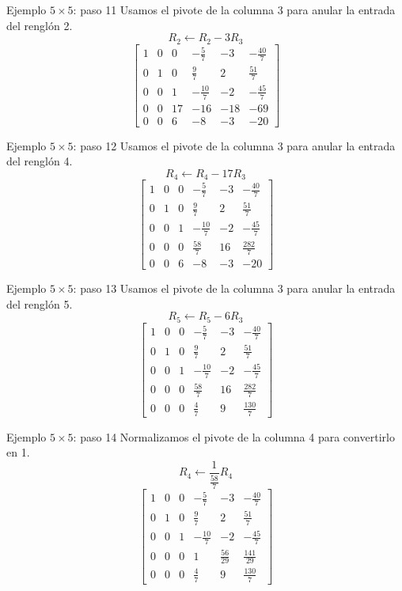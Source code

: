 \documentclass[aspectratio=169,9pt]{beamer}
\theoremstyle{remark}
\begin{document}
\begin{frame}[t]{Ejemplo $5\times5$: paso 11}
Usamos el pivote de la columna 3 para anular la entrada del renglón 2.
\[
R_{2}\leftarrow R_{2}-3R_{3}
\]
\[
\left[\begin{array}{ccccc|c}
1 & 0 & 0 & - \frac{5}{7} & -3 & - \frac{40}{7}\\
0 & 1 & 0 & \frac{9}{7} & 2 & \frac{51}{7}\\
0 & 0 & 1 & - \frac{10}{7} & -2 & - \frac{45}{7}\\
0 & 0 & 17 & -16 & -18 & -69\\
0 & 0 & 6 & -8 & -3 & -20
\end{array}\right]
\]
\end{frame}
\begin{frame}[t]{Ejemplo $5\times5$: paso 12}
Usamos el pivote de la columna 3 para anular la entrada del renglón 4.
\[
R_{4}\leftarrow R_{4}-17R_{3}
\]
\[
\left[\begin{array}{ccccc|c}
1 & 0 & 0 & - \frac{5}{7} & -3 & - \frac{40}{7}\\
0 & 1 & 0 & \frac{9}{7} & 2 & \frac{51}{7}\\
0 & 0 & 1 & - \frac{10}{7} & -2 & - \frac{45}{7}\\
0 & 0 & 0 & \frac{58}{7} & 16 & \frac{282}{7}\\
0 & 0 & 6 & -8 & -3 & -20
\end{array}\right]
\]
\end{frame}
\begin{frame}[t]{Ejemplo $5\times5$: paso 13}
Usamos el pivote de la columna 3 para anular la entrada del renglón 5.
\[
R_{5}\leftarrow R_{5}-6R_{3}
\]
\[
\left[\begin{array}{ccccc|c}
1 & 0 & 0 & - \frac{5}{7} & -3 & - \frac{40}{7}\\
0 & 1 & 0 & \frac{9}{7} & 2 & \frac{51}{7}\\
0 & 0 & 1 & - \frac{10}{7} & -2 & - \frac{45}{7}\\
0 & 0 & 0 & \frac{58}{7} & 16 & \frac{282}{7}\\
0 & 0 & 0 & \frac{4}{7} & 9 & \frac{130}{7}
\end{array}\right]
\]
\end{frame}
\begin{frame}[t]{Ejemplo $5\times5$: paso 14}
Normalizamos el pivote de la columna 4 para convertirlo en 1.
\[
R_{4}\leftarrow \frac{1}{\frac{58}{7}}R_{4}
\]
\[
\left[\begin{array}{ccccc|c}
1 & 0 & 0 & - \frac{5}{7} & -3 & - \frac{40}{7}\\
0 & 1 & 0 & \frac{9}{7} & 2 & \frac{51}{7}\\
0 & 0 & 1 & - \frac{10}{7} & -2 & - \frac{45}{7}\\
0 & 0 & 0 & 1 & \frac{56}{29} & \frac{141}{29}\\
0 & 0 & 0 & \frac{4}{7} & 9 & \frac{130}{7}
\end{array}\right]
\]
\end{frame}
\end{document}
